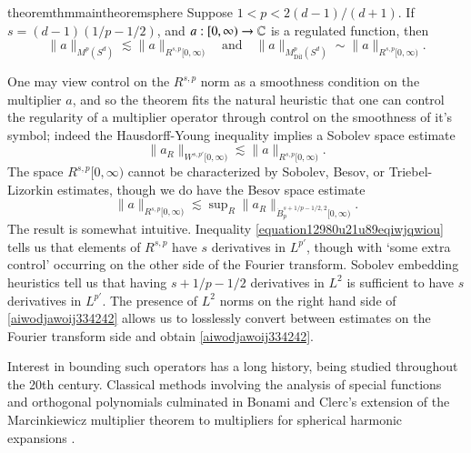 \begin{restatable}{theorem}{thmmaintheoremsphere} \label{maintheoremsphere}
  Suppose $1 < p < 2(d-1)/(d+1)$. If $s = (d-1)(1/p - 1/2)$, and $a: [0,\infty) \to \operatorname{\mathbb{C}}$ is a regulated function, then
  \[ \| a \|_{M^p(S^d)} \lesssim \| a \|_{R^{s,p}[0,\infty)} \quad\text{and}\quad \| a \|_{M^p_{\text{Dil}}(S^d)} \sim \| a \|_{R^{s,p}[0,\infty)}. \]
\end{restatable}

One may view control on the $R^{s,p}$ norm as a smoothness condition on the multiplier $a$, and so the theorem fits the natural heuristic that one can control the regularity of a multiplier operator through control on the smoothness of it's symbol; indeed the Hausdorff-Young inequality implies a Sobolev space estimate
%
\begin{equation} \label{equation12980u21u89eqiwjqwiou}
  \| a_R \|_{W^{s,p'}[0,\infty)} \lesssim \| a \|_{R^{s,p}[0,\infty)}.
\end{equation}
%
The space $R^{s,p}[0,\infty)$ cannot be characterized by Sobolev, Besov, or Triebel-Lizorkin estimates, though we do have the Besov space estimate
%
\begin{equation} \label{aiwodjawoij334242}
  \| a \|_{R^{s,p}[0,\infty)} \lesssim \sup\nolimits_R \| a_R \|_{\dot{B}^{s+1/p - 1/2,2}_p[0,\infty)}.
\end{equation}
%
The result is somewhat intuitive. Inequality \eqref{equation12980u21u89eqiwjqwiou} tells us that elements of $R^{s,p}$ have $s$ derivatives in $L^{p'}$, though with `some extra control' occurring on the other side of the Fourier transform. Sobolev embedding heuristics tell us that having $s + 1/p - 1/2$ derivatives in $L^2$ is sufficient to have $s$ derivatives in $L^{p'}$. The presence of $L^2$ norms on the right hand side of \eqref{aiwodjawoij334242} allows us to losslessly convert between estimates on the Fourier transform side and obtain \eqref{aiwodjawoij334242}.

Interest in bounding such operators has a long history, being studied throughout the 20th century. Classical methods involving the analysis of special functions and orthogonal polynomials culminated in Bonami and Clerc's extension of the Marcinkiewicz multiplier theorem to multipliers for spherical harmonic expansions \cite{BonamiClerc}.

